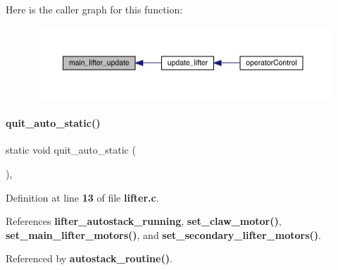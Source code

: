 Here is the caller graph for this function\+:
\nopagebreak
\begin{figure}[H]
\begin{center}
\leavevmode
\includegraphics[width=350pt]{lifter_8c_adfb6207ee1f20953058c8de81ec3386a_icgraph}
\end{center}
\end{figure}
\mbox{\label{lifter_8c_aa4d172cbde795bc13fe6baabd074717e}} 
\paragraph{quit\+\_\+auto\+\_\+static()}
{\footnotesize\ttfamily static void quit\+\_\+auto\+\_\+static (\begin{DoxyParamCaption}{ }\end{DoxyParamCaption})\hspace{0.3cm}{\ttfamily [inline]}, {\ttfamily [static]}}



Definition at line \textbf{ 13} of file \textbf{ lifter.\+c}.



References \textbf{ lifter\+\_\+autostack\+\_\+running}, \textbf{ set\+\_\+claw\+\_\+motor()}, \textbf{ set\+\_\+main\+\_\+lifter\+\_\+motors()}, and \textbf{ set\+\_\+secondary\+\_\+lifter\+\_\+motors()}.



Referenced by \textbf{ autostack\+\_\+routine()}.


